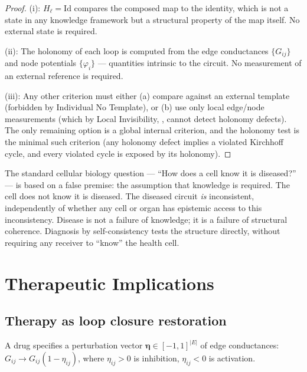 \documentclass[twocolumn,11pt,a4paper]{article}
\newcommand{\HolL}{H_\ell}
\newcommand{\drugvec}{\boldsymbol{\eta}}
\begin{document}
\begin{proof}
(i): $\HolL = \mathrm{Id}$ compares the composed map to the identity, which
is not a state in any knowledge framework but a structural property of the
map itself. No external state is required.

(ii): The holonomy of each loop is computed from the edge conductances
$\{G_{ij}\}$ and node potentials $\{\varphi_i\}$ --- quantities intrinsic
to the circuit. No measurement of an external reference is required.

(iii): Any other criterion must either (a) compare against an external
template (forbidden by Individual No Template), or (b) use only local
edge/node measurements (which by Local Invisibility,
, cannot detect holonomy defects). The only
remaining option is a global internal criterion, and the holonomy test is
the minimal such criterion (any holonomy defect implies a violated
Kirchhoff cycle, and every violated cycle is exposed by its holonomy).
\end{proof}

\begin{remark}\label{rem:paradox}
The standard cellular biology question --- ``How does a cell know it is
diseased?'' --- is based on a false premise: the assumption that knowledge
is required. The cell does not know it is diseased. The diseased circuit
\emph{is} inconsistent, independently of whether any cell or organ has
epistemic access to this inconsistency. Disease is not a failure of
knowledge; it is a failure of structural coherence. Diagnosis by
self-consistency tests the structure directly, without requiring any
receiver to ``know'' the health cell.
\end{remark}

\section{Therapeutic Implications}
\label{sec:therapy}

\subsection{Therapy as loop closure restoration}

\begin{definition}\label{def:drug}
A drug specifies a perturbation vector
$\drugvec \in [-1,1]^{|E|}$ of edge conductances:
$G_{ij} \to G_{ij}(1 - \eta_{ij})$,
where $\eta_{ij} > 0$ is inhibition, $\eta_{ij} < 0$ is activation.
\end{definition}
\end{document}
